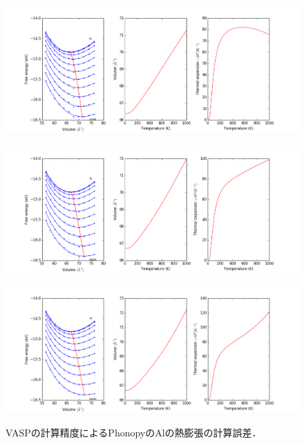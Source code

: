\begin{figure}[htbp]
 \begin{minipage}[b]{1.0\linewidth}
  \centering
  \includegraphics[keepaspectratio, scale=0.45]
  {../image/figure_1.png}
  \label{phonopy1}
 \end{minipage}
  \begin{minipage}[b]{1.0\linewidth}
  \centering
  \includegraphics[keepaspectratio, scale=0.45]
  {../image/figure_2.png}
  \label{phonopy2}
 \end{minipage}
   \begin{minipage}[b]{1.0\linewidth}
  \centering
  \includegraphics[keepaspectratio, scale=0.45]
  {../image/figure_3.png}
  \label{phonopy3}
 \end{minipage}
 \caption{VASPの計算精度によるPhonopyのAlの熱膨張の計算誤差．}\label{fig:phonopy}
\end{figure}



